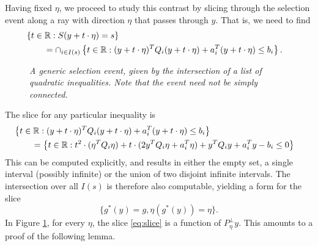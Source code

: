 \documentclass{imsart}
\begin{document}
Having fixed $\eta$, we proceed to study this contrast by slicing through the selection event along a ray with direction $\eta$ that passes through $y$. 
That is, we need to find
$$
\begin{aligned}
\lefteqn{
\left\{t \in \mathbb R : S(y+t \cdot \eta)=s \right\} } \\
 & \qquad = \cap_{i \in I(s)} \left\{t \in \mathbb R : (y+t \cdot \eta)^T Q_i (y+t \cdot \eta) + a_i^T(y+t \cdot \eta) \leq b_i\right\}. \\
\end{aligned}
$$
\begin{figure}
\begin{center}
\resizebox{!}{3in}{}
\end{center}
\caption{ \em
A generic selection event, given by the intersection of a list
of quadratic inequalities. Note that the event need not be simply connected.
}
\label{fig:curved}
\end{figure}
The slice for any particular inequality is
\begin{equation}
\begin{aligned}
\label{eq:quadslice}
\lefteqn{
\left\{t \in \mathbb R : (y+t\cdot \eta)^T Q_i (y+t \cdot \eta) + a_i^T(y+t \cdot \eta) \leq b_i\right\}} \\
 & \qquad = \left\{t \in \mathbb R : t^2 \cdot (\eta^TQ_i\eta) + t \cdot(2 y^TQ_i\eta + a_i^T\eta) + y^TQ_iy + a_i^Ty - b_i \leq 0 \right\} \\
\end{aligned}
\end{equation}
This can be computed explicitly, and results in either the empty set, a single interval (possibly infinite) or the union of 
two disjoint infinite intervals. The intersection over all $I(s)$ is therefore also computable, yielding a form for the slice
\begin{equation}
\label{eq:slice}
\{g^*(y)=g, \eta(g^*(y))=\eta\}.
\end{equation}
In Figure \ref{fig:curved}, for every $\eta$, the slice \eqref{eq:slice} is a function
of $P_{\eta}^{\perp}y$. This amounts to a proof of the following lemma.
\end{document}
